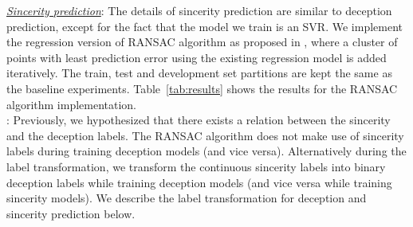 \documentclass{article}
\begin{document}
\begin{spacing}{0.89}
\underline{\it Sincerity prediction}: 
The details of sincerity prediction are similar to deception prediction, except for the fact that the model we train is an SVR.
We implement the regression version of RANSAC algorithm as proposed in \cite{raguram2013usac}, where a cluster of points with least prediction error using the existing regression model is added iteratively. 
The train, test and development set partitions are kept the same as the baseline experiments.
Table~\ref{tab:results} shows the results for the RANSAC algorithm implementation.
\\

:
Previously, we hypothesized that there exists a relation between the sincerity and the deception labels.
The RANSAC algorithm does not make use of sincerity labels during training deception models (and vice versa). 
Alternatively during the label transformation, we transform the continuous sincerity labels into binary deception labels while training deception models (and vice versa while training sincerity models).
We describe the label transformation for deception and sincerity prediction below.


\end{spacing}
\end{document}
